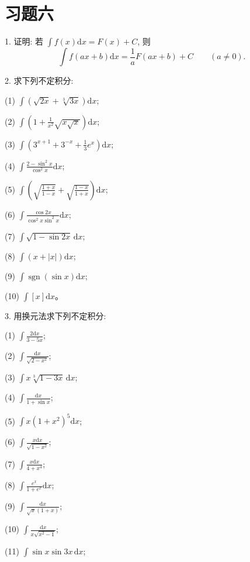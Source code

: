\documentclass[UTF8,12pt,a4paper,fontset=fandol]{ctexart}
\begin{document}
\section*{习题六}

1. 证明: 若 $\displaystyle \int f(x)\mathrm dx=F(x)+C$, 则
\[
  \int f(ax+b)\mathrm dx=\frac1aF(ax+b)+C\qquad(a\ne0).
\]

2. 求下列不定积分:

(1) $\displaystyle \int\left(\sqrt{2x}+\sqrt[3]{3x}\right)\mathrm dx$;

(2) $\displaystyle \int\left(1+\frac1{x^2}\sqrt{x\sqrt x}\right)\mathrm dx$;

(3) $\displaystyle \int\left(3^{x+1}+3^{-x}+\frac13e^x\right)\mathrm dx$;

(4) $\displaystyle \int\frac{2-\sin^2x}{\cos^2x}\mathrm dx$;

(5) $\displaystyle \int\left(\sqrt{\frac{1+x}{1-x}}+\sqrt{\frac{1-x}{1+x}}\right)\mathrm dx$;

(6) $\displaystyle \int\frac{\cos2x}{\cos^2x\sin^2x}\mathrm dx$;

(7) $\displaystyle \int\sqrt{1-\sin2x}\,\mathrm dx$;

(8) $\displaystyle \int(x+|x|)\mathrm dx$;

(9) $\displaystyle \int\operatorname{sgn}(\sin x)\mathrm dx$;

(10) $\displaystyle \int[x]\mathrm dx$。

3. 用换元法求下列不定积分:

(1) $\displaystyle \int\frac{2\mathrm dx}{3-5x}$;

(2) $\displaystyle \int\frac{\mathrm dx}{\sqrt{2-x^2}}$;

(3) $\displaystyle \int x\sqrt[3]{1-3x}\,\mathrm dx$;

(4) $\displaystyle \int\frac{\mathrm dx}{1+\sin x}$;

(5) $\displaystyle \int x(1+x^2)^5\mathrm dx$;

(6) $\displaystyle \int\frac{x\mathrm dx}{\sqrt{1-x^2}}$;

(7) $\displaystyle \int\frac{x\mathrm dx}{4+x^4}$;

(8) $\displaystyle \int\frac{e^x}{1+e^x}\mathrm dx$;

(9) $\displaystyle \int\frac{\mathrm dx}{\sqrt x(1+x)}$;

(10) $\displaystyle \int\frac{\mathrm dx}{x\sqrt{x^2-1}}$;

(11) $\displaystyle \int\sin x\sin3x\,\mathrm dx$;
\end{document}
